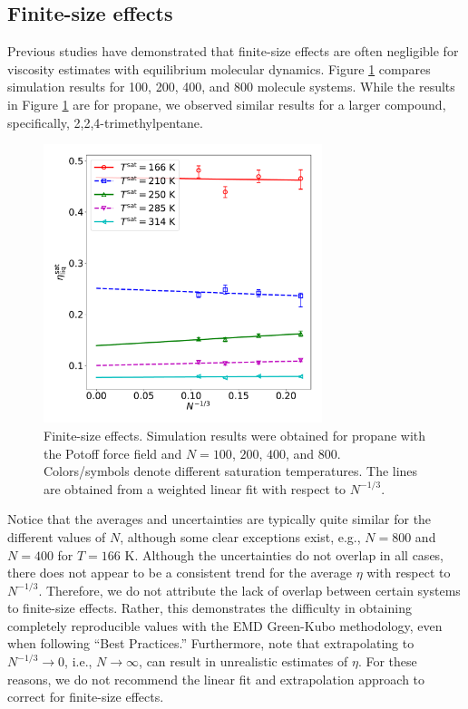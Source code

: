 \documentclass[preprint,review,12pt]{elsarticle}
\begin{document}
	\subsection{Finite-size effects}

	Previous studies have demonstrated that finite-size effects are often negligible for viscosity estimates with equilibrium molecular dynamics. Figure \ref{fig:finite_size_effects} compares simulation results for 100, 200, 400, and 800 molecule systems. While the results in Figure \ref{fig:finite_size_effects} are for propane, we observed similar results for a larger compound, specifically, 2,2,4-trimethylpentane.
	
	
	
	\begin{figure}[htb!]
		\centering
		\includegraphics[width=3.2in]{C3H8_Potoff_finite_size_effects.pdf}
		\caption{Finite-size effects. Simulation results were obtained for propane with the Potoff force field and $N= 100$, $200$, $400$, and $800$. Colors/symbols denote different saturation temperatures. The lines are obtained from a weighted linear fit with respect to $N^{-1/3}$.}
		\label{fig:finite_size_effects}
	\end{figure} 
	
	Notice that the averages and uncertainties are typically quite similar for the different values of $N$, although some clear exceptions exist, e.g., $N = 800$ and $N=400$ for $T = 166$ K. Although the uncertainties do not overlap in all cases, there does not appear to be a consistent trend for the average $\eta$ with respect to $N^{-1/3}$. Therefore, we do not attribute the lack of overlap between certain systems to finite-size effects. Rather, this demonstrates the difficulty in obtaining completely reproducible values with the EMD Green-Kubo methodology, even when following ``Best Practices.'' Furthermore, note that extrapolating to $N^{-1/3} \rightarrow 0$, i.e., $N \rightarrow \infty$, can result in unrealistic estimates of $\eta$. For these reasons, we do not recommend the linear fit and extrapolation approach to correct for finite-size effects.
	
\end{document}

